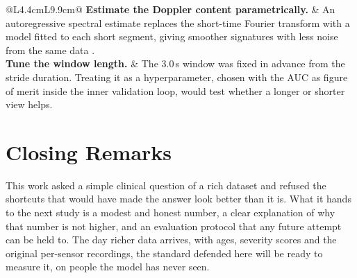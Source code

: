 \begin{table}[H]
\begin{tabular}{@{}L{4.4cm}L{9.9cm}@{}}
    \addlinespace
    \textbf{Estimate the Doppler content parametrically.} &
    An autoregressive spectral estimate replaces the short-time Fourier
    transform with a model fitted to each short segment, giving smoother
    signatures with less noise from the same data \cite{kaymarple1981}. \\
    \addlinespace
    \textbf{Tune the window length.} &
    The 3.0\,s window was fixed in advance from the stride duration. Treating
    it as a hyperparameter, chosen with the AUC as figure of merit inside the
    inner validation loop, would test whether a longer or shorter view helps. \\
    \bottomrule
  \end{tabular}
\end{table}

\section{Closing Remarks}
\label{sec:closing}

This work asked a simple clinical question of a rich dataset and refused the
shortcuts that would have made the answer look better than it is. What it
hands to the next study is a modest and honest number, a clear explanation of
why that number is not higher, and an evaluation protocol that any future
attempt can be held to. The day richer data arrives, with ages, severity
scores and the original per-sensor recordings, the standard defended here
will be ready to measure it, on people the model has never seen.
